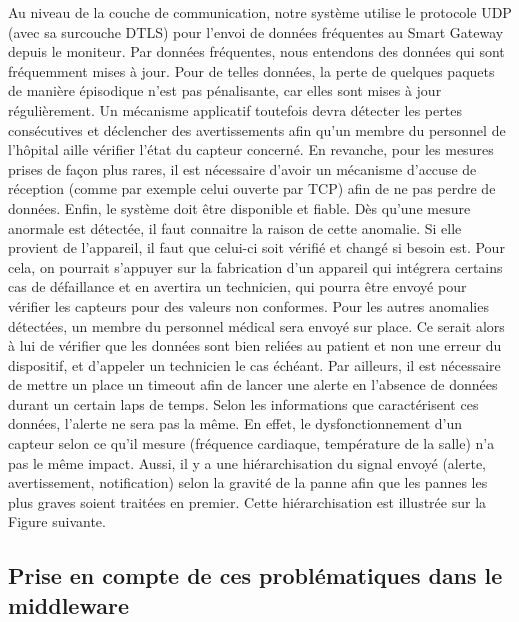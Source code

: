 Au niveau de la couche de communication, notre système utilise le protocole UDP (avec sa surcouche DTLS) pour l’envoi de données fréquentes au Smart Gateway depuis le moniteur. Par données fréquentes, nous entendons des données qui sont fréquemment mises à jour. Pour de telles données, la perte de quelques paquets de manière épisodique n’est pas pénalisante, car elles sont mises à jour régulièrement. Un mécanisme applicatif toutefois devra détecter les pertes consécutives et déclencher des avertissements afin qu’un membre du personnel de l’hôpital aille vérifier l’état du capteur concerné. En revanche, pour les mesures prises de façon plus rares, il est nécessaire d’avoir un mécanisme d’accuse de réception (comme par exemple celui ouverte par TCP) afin de ne pas perdre de données. Enfin, le système doit être disponible et fiable. Dès qu’une mesure anormale est détectée, il faut connaitre la raison de cette anomalie. Si elle provient de l’appareil, il faut que celui-ci soit vérifié et changé si besoin est. Pour cela, on pourrait s’appuyer sur la fabrication d’un appareil qui intégrera certains cas de défaillance et en avertira un technicien, qui pourra être envoyé pour vérifier les capteurs pour des valeurs non conformes. Pour les autres anomalies détectées, un membre du personnel médical sera envoyé sur place. Ce serait alors à lui de vérifier que les données sont bien reliées au patient et non une erreur du dispositif, et d’appeler un technicien le cas échéant. Par ailleurs, il est nécessaire de mettre un place un timeout afin de lancer une alerte en l’absence de données durant un certain laps de temps. Selon les informations que caractérisent ces données, l’alerte ne sera pas la même. En effet, le dysfonctionnement d’un capteur selon ce qu’il mesure (fréquence cardiaque, température de la salle) n’a pas le même impact. Aussi, il y a une hiérarchisation du signal envoyé (alerte, avertissement, notification) selon la gravité de la panne afin que les pannes les plus graves soient traitées en premier. Cette hiérarchisation est illustrée sur la Figure suivante.
 
\subsection{Prise en compte de ces problématiques dans le middleware}
 
